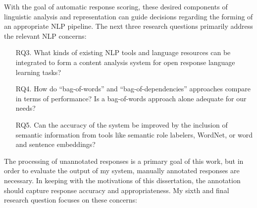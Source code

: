 With the goal of automatic response scoring, these desired components of linguistic analysis and representation can guide decisions regarding the forming of an appropriate NLP pipeline. The next three research questions primarily address the relevant NLP concerns:

\begin{itemize}
\item[RQ3.]{What kinds of existing NLP tools and language resources can be integrated to form a content analysis system for open response language learning tasks?}
\end{itemize}

\begin{itemize}
\item[RQ4.]{How do ``bag-of-words'' and ``bag-of-dependencies'' approaches compare in terms of performance? Is a bag-of-words approach alone adequate for our needs?}
\end{itemize}

\begin{itemize}
\item[RQ5.]{Can the accuracy of the system be improved by the inclusion of semantic information from tools like semantic role labelers, WordNet, or word and sentence embeddings?}
\end{itemize}

The processing of unannotated responses is a primary goal of this work, but in order to evaluate the output of my system, manually annotated responses are necessary. In keeping with the motivations of this dissertation, the annotation should capture response accuracy and appropriateness. My sixth and final research question focuses on these concerns:

